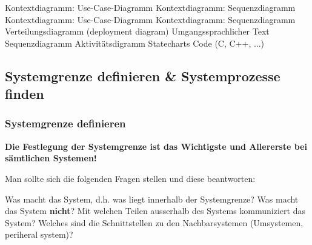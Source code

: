\begin{minipage}[c]{0.6\columnwidth}
    \begingroup
    \renewcommand{\outlinei}{enumerate}
    \renewcommand{\outlineii}{itemize}

    \begin{outline}
        \1  
            \2 Kontextdiagramm: Use-Case-Diagramm
            \2 Kontextdiagramm: Sequenzdiagramm
        \1 
            \2 Kontextdiagramm: Use-Case-Diagramm
            \2 Kontextdiagramm: Sequenzdiagramm
        \1 
            \2 Verteilungsdiagramm (deployment diagram)
        \1 
            \2 Umgangssprachlicher Text
            \2 Sequenzdiagramm
            \2 Aktivitätsdigramm
            \2 Statecharts
            \2 Code (C, C++, ...)
    \end{outline}
    \endgroup
\end{minipage}
\hfill
\begin{minipage}[c]{0.38\columnwidth}
    \raggedright
    
    \vspace{0.2cm}

\end{minipage}


\subsection{Systemgrenze definieren \& Systemprozesse finden}

\subsubsection{Systemgrenze definieren}

\textbf{Die Festlegung der Systemgrenze ist das Wichtigste und Allererste bei sämtlichen Systemen!}

Man sollte sich die folgenden Fragen stellen und diese beantworten:

\vspace{0.1cm}

\begin{outline}
    \1 Was macht das System, d.h. was liegt innerhalb der Systemgrenze?
        \2 Was macht das System  \textbf{nicht}?
    \1 Mit welchen Teilen ausserhalb des Systems kommuniziert das System?
    \1 Welches sind die Schnittstellen zu den Nachbarsystemen (Umsystemen, periheral system)?
\end{outline}



